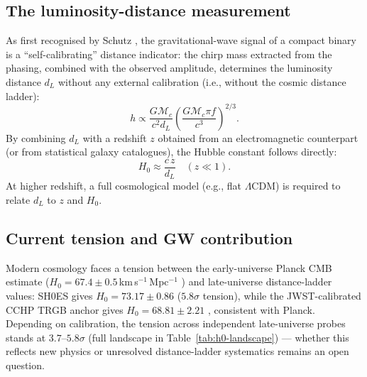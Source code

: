 \documentclass[11pt,a4paper, english]{book}
\theoremstyle{plain}
\theoremstyle{definition}
\numberwithin{equation}{chapter}
\numberwithin{figure}{chapter}
\numberwithin{table}{chapter}
\begin{document}
\subsection{The luminosity-distance measurement}
\label{subsec:siren-distance}

As first recognised by Schutz \citeyear{Schutz_1986}, the gravitational-wave
signal of a compact binary is a ``self-calibrating'' distance indicator:
the chirp mass extracted from the phasing, combined with the observed
amplitude, determines the luminosity distance $d_L$ without any external
calibration (i.e., without the cosmic distance ladder):
\begin{equation}
  \label{eq:siren_amplitude}
  h \propto \frac{G\mathcal{M}_c}{c^2 d_L}
    \left(\frac{G\mathcal{M}_c \pi f}{c^3}\right)^{2/3}.
\end{equation}
By combining $d_L$ with a redshift $z$ obtained from an electromagnetic
counterpart (or from statistical galaxy catalogues), the Hubble constant
follows directly:
\begin{equation}
  \label{eq:siren_h0}
  H_0 \approx \frac{c\,z}{d_L}
    \quad (z \ll 1).
\end{equation}
At higher redshift, a full cosmological model (e.g., flat $\Lambda$CDM) is
required to relate $d_L$ to $z$ and $H_0$.

\subsection{Current tension and GW contribution}
\label{subsec:hubble-tension}

Modern cosmology faces a tension between the early-universe Planck CMB
estimate ($H_0 = 67.4 \pm 0.5$\,km\,s$^{-1}$\,Mpc$^{-1}$
\cite{Planck_2020}) and late-universe distance-ladder values: SH0ES gives
$H_0 = 73.17 \pm 0.86$ \cite{Breuval_2024} ($5.8\sigma$ tension), while
the JWST-calibrated CCHP TRGB anchor gives $H_0 = 68.81 \pm 2.21$
\cite{Freedman_2024}, consistent with Planck. Depending on calibration,
the tension across independent late-universe probes stands at
$3.7$--$5.8\sigma$ (full landscape in Table~\ref{tab:h0-landscape}) — whether this reflects new
physics or unresolved distance-ladder systematics remains an open
question.
\end{document}

